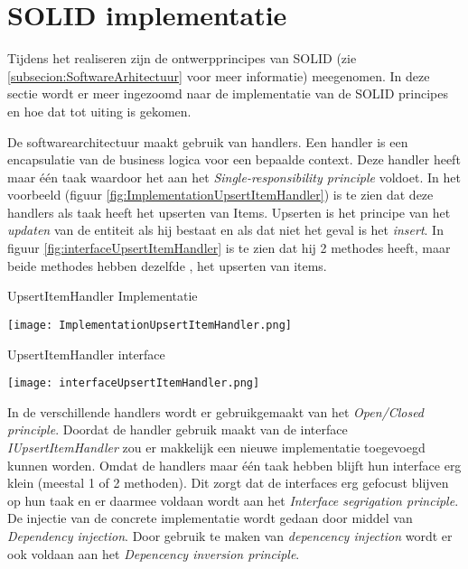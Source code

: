 \section{SOLID implementatie}
Tijdens het realiseren zijn de ontwerpprincipes van SOLID (zie \ref{subsecion:SoftwareArhitectuur} voor meer informatie) meegenomen.
In deze sectie wordt er meer ingezoomd naar de implementatie van de SOLID principes en hoe dat tot uiting is gekomen.

\whitespace
De softwarearchitectuur maakt gebruik van handlers.
Een handler is een encapsulatie van de business logica voor een bepaalde context.
Deze handler heeft maar één taak waardoor het aan het \textit{Single-responsibility principle} voldoet.
In het voorbeeld (figuur \ref{fig:ImplementationUpsertItemHandler}) is te zien dat deze handlers als taak heeft het upserten van Items.
Upserten is het principe van het \textit{updaten} van de entiteit als hij bestaat en als dat niet het geval is het \textit{insert}.
In figuur \ref{fig:interfaceUpsertItemHandler} is te zien dat hij 2 methodes heeft, maar beide methodes hebben dezelfde , het upserten van items.

\whitespace
\begin{graphic}
    \captionsetup{type=figure}
    \caption{UpsertItemHandler Implementatie}
    \texttt{[image: ImplementationUpsertItemHandler.png]}
    \label{fig:ImplementationUpsertItemHandler}
\end{graphic}

\whitespace[2]
\begin{graphic}
    \captionsetup{type=figure}
    \caption{UpsertItemHandler interface}
    \texttt{[image: interfaceUpsertItemHandler.png]}
    \label{fig:interfaceUpsertItemHandler}
\end{graphic}

\whitespace
In de verschillende handlers wordt er gebruikgemaakt van het \textit{Open\slash Closed principle}.
Doordat de handler gebruik maakt van de interface \textit{IUpsertItemHandler} zou er makkelijk een nieuwe implementatie toegevoegd kunnen worden.
Omdat de handlers maar één taak hebben blijft hun interface erg klein (meestal 1 of 2 methoden).
Dit zorgt dat de interfaces erg gefocust blijven op hun taak en er daarmee voldaan wordt aan het \textit{Interface segrigation principle}.
De injectie van de concrete implementatie wordt gedaan door middel van \textit{Dependency injection}.
Door gebruik te maken van \textit{depencency injection} wordt er ook voldaan aan het \textit{Depencency inversion principle}.


